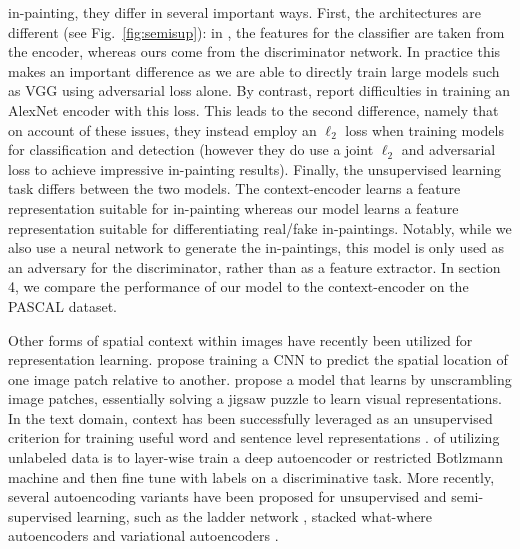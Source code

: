 \documentclass{article} %
\newcommand{\fig}[1]{Fig.~\ref{fig:#1}}
\begin{document}
in-painting, they differ in several important ways. First, the
architectures are different (see \fig{semisup}): in \cite{pathak2016},
the features for the classifier are taken from the encoder, whereas
ours come from the discriminator network. In practice this makes an
important difference as we are able to directly train large models
such as VGG \citep{vgg} using adversarial loss alone. By contrast,
\cite{pathak2016} report difficulties in training an
AlexNet encoder with this loss. This leads to the second difference,
namely that on account of these issues, they instead employ an
$\ell_2$ loss when training models for classification and detection
(however they do use a joint $\ell_2$ and adversarial loss to achieve
impressive in-painting results).  Finally, the unsupervised learning
task differs between the two models.  The context-encoder learns a
feature representation suitable for in-painting whereas our model
learns a feature representation suitable for differentiating real/fake
in-paintings.  Notably, while we also use a neural network to generate
the in-paintings, this model is only used as an adversary for the
discriminator, rather than as a feature extractor.  In section 4, we
compare the performance of our model to the context-encoder on the
PASCAL dataset.

Other forms of spatial context within images have recently been
utilized for representation learning.  
\cite{doersch2015} propose training a CNN to predict the spatial
location of one image patch relative to another.  
\cite{noroozi2016} propose a model that learns by unscrambling image
patches, essentially solving a jigsaw puzzle to learn visual
representations. In the text domain, context has been successfully
leveraged as an unsupervised criterion for training useful word and
sentence level representations \citep{collobert2011, mikolov2013,
  kiros2015}.  
of utilizing unlabeled data is to layer-wise train a deep autoencoder
or restricted Botlzmann machine \citep{hinton2006} and then fine tune
with labels on a discriminative task.  More recently, several
autoencoding variants have been proposed for unsupervised and
semi-supervised learning, such as the ladder network \citep{ramus2015},
stacked what-where autoencoders \citep{zhao2016} and variational
autoencoders \citep{kingma2014a, kingma2014b}.
\end{document}
